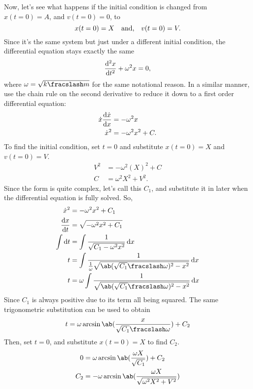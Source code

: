 Now, let's see what happens if the initial condition is changed from $x(t = 0) = A$, and $v(t = 0) = 0$, to
\begin{equation}
	x(t = 0) = X \quad\textrm{and,}\quad v(t = 0) = V.
\end{equation}
Since it's the same system but just under a different initial condition, the differential equation stays exactly the same
\begin{equation}
	\odv[ord = 2]{x}{t} + \omega^2x = 0,
\end{equation}
where $\omega = \sqrt{\flatfrac{k}{m}}$ for the same notational reason. In a similar manner, use the chain rule on the second derivative to reduce it down to a first order differential equation:
\begin{align}
	\dot{x}\odv{\dot{x}}{x} &= -\omega^2x \\
	\dot{x}^2 &= -\omega^2x^2 + C.
\end{align}
To find the initial condition, set $t = 0$ and substitute $x(t = 0) = X$ and $v(t = 0) = V$.
\begin{align}
	V^2 &= -\omega^2(X)^2 + C \\
	C &= \omega^2X^2 + V^2.
\end{align}
Since the form is quite complex, let's call this $C_1$, and substitute it in later when the differential equation is fully solved. So,
\begin{align}
	\dot{x}^2 &= -\omega^2x^2 + C_1 \\
	\odv{x}{t} &= \sqrt{-\omega^2x^2 + C_1} \\
	\int\odif{t} &= \int\frac{1}{\sqrt{C_1 - \omega^2x^2}}\odif{x} \\
	t &= \int\frac{1}{\frac{1}{\omega}\sqrt{\ab(\flatfrac{\sqrt{C_1}}{\omega})^2 - x^2}}\odif{x} \\
	t &= \omega\int\frac{1}{\sqrt{\ab(\flatfrac{\sqrt{C_1}}{\omega})^2 - x^2}}\odif{x}
\end{align}
Since $C_1$ is always positive due to its term all being squared. The same trigonometric substitution can be used to obtain
\begin{align}
	t = \omega\arcsin\ab(\frac{x}{\flatfrac{\sqrt{C_1}}{\omega}}) + C_2
\end{align}
Then, set $t = 0$, and substitute $x(t = 0) = X$ to find $C_2$.
\begin{align}
	0 &= \omega\arcsin\ab(\frac{\omega X}{\sqrt{C_1}}) + C_2 \\
	C_2 &= -\omega\arcsin\ab(\frac{\omega X}{\sqrt{\omega^2X^2 + V^2}})
\end{align}


